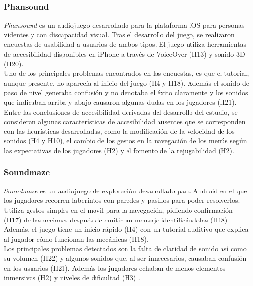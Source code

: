 \subsubsection{Phansound}
\textit{Phansound} es un audiojuego desarrollado para la plataforma iOS para personas videntes y con discapacidad visual. Tras el desarrollo del juego, se realizaron encuestas de usabilidad a usuarios de ambos tipos. El juego utiliza herramientas de accesibilidad disponibles en iPhone a través de VoiceOver (H13) y sonido 3D (H20). \cite{tausPhanSoundEntertainmentAudiogame2023b}\\

Uno de los principales problemas encontrados en las encuestas, es que el tutorial, aunque presente, no aparecía al inicio del juego (H4 y H18). Además el sonido de paso de nivel generaba confusión y no denotaba el éxito claramente y los sonidos que indicaban arriba y abajo causaron algunas dudas en los jugadores (H21). \cite[p ~5]{tausPhanSoundEntertainmentAudiogame2023b}\\

Entre las conclusiones de accesibilidad derivadas del desarrollo del estudio, se consideran algunas características de accesibilidad ausentes que se corresponden con las heurísticas desarrolladas, como la modificación de la velocidad de los sonidos (H4 y H10), el cambio de los gestos en la navegación de los menús según las expectativas de los jugadores (H2) y el fomento de la rejugabilidad (H2).\\

\subsubsection{Soundmaze}
\textit{Soundmaze} es un audiojuego de exploración desarrollado para Android en el que los jugadores recorren laberintos con paredes y pasillos para poder resolverlos. Utiliza gestos simples en el móvil para la navegación, pidiendo confirmación (H17) de las acciones después de emitir un mensaje identificándolas (H18). Además, el juego tiene un inicio rápido (H4) con un tutorial auditivo que explica al jugador cómo funcionan las mecánicas (H18).\cite{avilaSoundmazeDesenvolvimentoUm2020}\\

Los principales problemas detectados son la falta de claridad de sonido así como su volumen (H22) y algunos sonidos que, al ser innecesarios, causaban confusión en los usuarios (H21). Además los jugadores echaban de menos elementos inmersivos (H2) y niveles de dificultad (H3) \cite[p ~498]{avilaSoundmazeDesenvolvimentoUm2020}.\\

